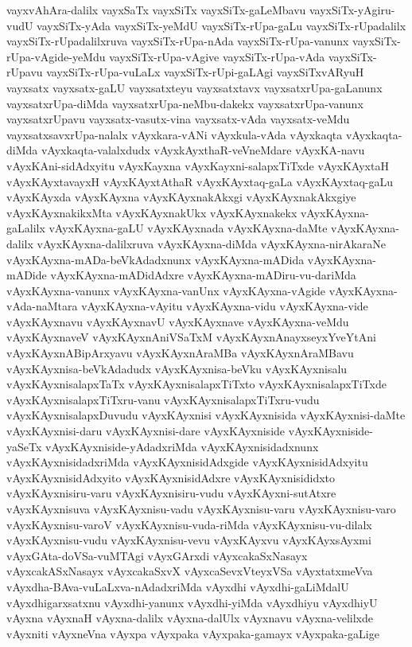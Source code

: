 {vayxvAhAra-dalilx
vayxSaTx
vayxSiTx
vayxSiTx-gaLeMbavu
vayxSiTx-yAgiru-vudU
vayxSiTx-yAda
vayxSiTx-yeMdU
vayxSiTx-rUpa-gaLu
vayxSiTx-rUpadalilx
vayxSiTx-rUpadalilxruva
vayxSiTx-rUpa-nAda
vayxSiTx-rUpa-vanunx
vayxSiTx-rUpa-vAgide-yeMdu
vayxSiTx-rUpa-vAgive
vayxSiTx-rUpa-vAda
vayxSiTx-rUpavu
vayxSiTx-rUpa-vuLaLx
vayxSiTx-rUpi-gaLAgi
vayxSiTxvARyuH
vayxsatx
vayxsatx-gaLU
vayxsatxteyu
vayxsatxtavx
vayxsatxrUpa-gaLanunx
vayxsatxrUpa-diMda
vayxsatxrUpa-neMbu-dakekx
vayxsatxrUpa-vanunx
vayxsatxrUpavu
vayxsatx-vasutx-vina
vayxsatx-vAda
vayxsatx-veMdu
vayxsatxsavxrUpa-nalalx
vAyxkara-vANi
vAyxkula-vAda
vAyxkaqta
vAyxkaqta-diMda
vAyxkaqta-valalxdudx
vAyxkAyxthaR-veVneMdare
vAyxKA-navu
vAyxKAni-sidAdxyitu
vAyxKayxna
vAyxKayxni-salapxTiTxde
vAyxKAyxtaH
vAyxKAyxtavayxH
vAyxKAyxtAthaR
vAyxKAyxtaq-gaLa
vAyxKAyxtaq-gaLu
vAyxKAyxda
vAyxKAyxna
vAyxKAyxnakAkxgi
vAyxKAyxnakAkxgiye
vAyxKAyxnakikxMta
vAyxKAyxnakUkx
vAyxKAyxnakekx
vAyxKAyxna-gaLalilx
vAyxKAyxna-gaLU
vAyxKAyxnada
vAyxKAyxna-daMte
vAyxKAyxna-dalilx
vAyxKAyxna-dalilxruva
vAyxKAyxna-diMda
vAyxKAyxna-nirAkaraNe
vAyxKAyxna-mADa-beVkAdadxnunx
vAyxKAyxna-mADida
vAyxKAyxna-mADide
vAyxKAyxna-mADidAdxre
vAyxKAyxna-mADiru-vu-dariMda
vAyxKAyxna-vanunx
vAyxKAyxna-vanUnx
vAyxKAyxna-vAgide
vAyxKAyxna-vAda-naMtara
vAyxKAyxna-vAyitu
vAyxKAyxna-vidu
vAyxKAyxna-vide
vAyxKAyxnavu
vAyxKAyxnavU
vAyxKAyxnave
vAyxKAyxna-veMdu
vAyxKAyxnaveV
vAyxKAyxnAniVSaTxM
vAyxKAyxnAnayxseyxYveYtAni
vAyxKAyxnABipArxyavu
vAyxKAyxnAraMBa
vAyxKAyxnAraMBavu
vAyxKAyxnisa-beVkAdadudx
vAyxKAyxnisa-beVku
vAyxKAyxnisalu
vAyxKAyxnisalapxTaTx
vAyxKAyxnisalapxTiTxto
vAyxKAyxnisalapxTiTxde
vAyxKAyxnisalapxTiTxru-vanu
vAyxKAyxnisalapxTiTxru-vudu
vAyxKAyxnisalapxDuvudu
vAyxKAyxnisi
vAyxKAyxnisida
vAyxKAyxnisi-daMte
vAyxKAyxnisi-daru
vAyxKAyxnisi-dare
vAyxKAyxniside
vAyxKAyxniside-yaSeTx
vAyxKAyxniside-yAdadxriMda
vAyxKAyxnisidadxnunx
vAyxKAyxnisidadxriMda
vAyxKAyxnisidAdxgide
vAyxKAyxnisidAdxyitu
vAyxKAyxnisidAdxyito
vAyxKAyxnisidAdxre
vAyxKAyxnisididxto
vAyxKAyxnisiru-varu
vAyxKAyxnisiru-vudu
vAyxKAyxni-sutAtxre
vAyxKAyxnisuva
vAyxKAyxnisu-vadu
vAyxKAyxnisu-varu
vAyxKAyxnisu-varo
vAyxKAyxnisu-varoV
vAyxKAyxnisu-vuda-riMda
vAyxKAyxnisu-vu-dilalx
vAyxKAyxnisu-vudu
vAyxKAyxnisu-vevu
vAyxKAyxvu
vAyxKAyxsAyxmi
vAyxGAta-doVSa-vuMTAgi
vAyxGArxdi
vAyxcakaSxNasayx
vAyxcakASxNasayx
vAyxcakaSxvX
vAyxcaSevxVteyxVSa
vAyxtatxmeVva
vAyxdha-BAva-vuLaLxva-nAdadxriMda
vAyxdhi
vAyxdhi-gaLiMdalU
vAyxdhigarxsatxnu
vAyxdhi-yanunx
vAyxdhi-yiMda
vAyxdhiyu
vAyxdhiyU
vAyxna
vAyxnaH
vAyxna-dalilx
vAyxna-dalUlx
vAyxnavu
vAyxna-velilxde
vAyxniti
vAyxneVna
vAyxpa
vAyxpaka
vAyxpaka-gamayx
vAyxpaka-gaLige
}
